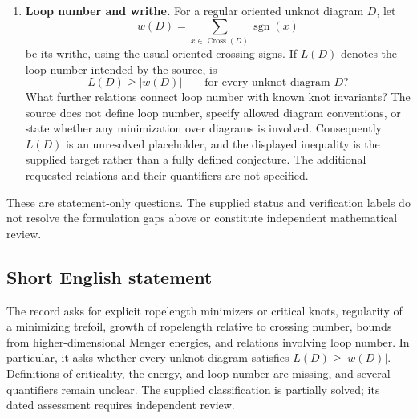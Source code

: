 \documentclass[11pt]{article}
\begin{document}
\begin{enumerate}
\item \textbf{Loop number and writhe.} For a regular oriented unknot diagram \(D\), let
\[
w(D)=\sum_{x\in\operatorname{Cross}(D)}\operatorname{sgn}(x)
\]
be its writhe, using the usual oriented crossing signs. If \(L(D)\) denotes the loop number intended by the source, is
\[
L(D)\geq |w(D)|\qquad\text{for every unknot diagram }D?
\]
What further relations connect loop number with known knot invariants? The source does not define loop number, specify allowed diagram conventions, or state whether any minimization over diagrams is involved. Consequently \(L(D)\) is an unresolved placeholder, and the displayed inequality is the supplied target rather than a fully defined conjecture. The additional requested relations and their quantifiers are not specified.
\end{enumerate}

These are statement-only questions. The supplied status and verification labels do not resolve the formulation gaps above or constitute independent mathematical review.
\subsection{Short English statement}
The record asks for explicit ropelength minimizers or critical knots, regularity of a minimizing trefoil, growth of ropelength relative to crossing number, bounds from higher-dimensional Menger energies, and relations involving loop number. In particular, it asks whether every unknot diagram satisfies \(L(D)\geq |w(D)|\). Definitions of criticality, the energy, and loop number are missing, and several quantifiers remain unclear. The supplied classification is partially solved; its dated assessment requires independent review.
\end{document}
